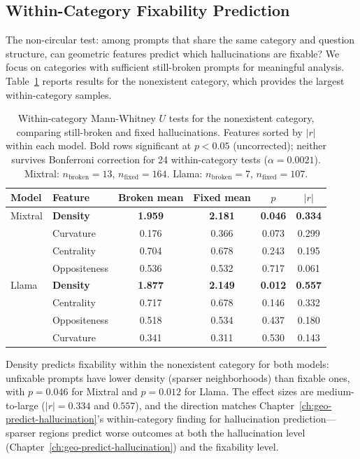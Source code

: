 \subsection{Within-Category Fixability Prediction}
\label{sec:within-cat-fixability}

The non-circular test: among prompts that share the same category and question structure, can geometric features predict which hallucinations are fixable? We focus on categories with sufficient still-broken prompts for meaningful analysis. Table~\ref{tab:within-cat-fixability} reports results for the nonexistent category, which provides the largest within-category samples.

\begin{table}[ht]
\centering
\small
\begin{tabular}{@{}llcccc@{}}
\toprule
\textbf{Model} & \textbf{Feature} & \textbf{Broken mean} & \textbf{Fixed mean} & $p$ & $|r|$ \\
\midrule
Mixtral & \textbf{Density} & \textbf{1.959} & \textbf{2.181} & \textbf{0.046} & \textbf{0.334} \\
        & Curvature & 0.176 & 0.366 & 0.073 & 0.299 \\
        & Centrality & 0.704 & 0.678 & 0.243 & 0.195 \\
        & Oppositeness & 0.536 & 0.532 & 0.717 & 0.061 \\
\addlinespace
Llama   & \textbf{Density} & \textbf{1.877} & \textbf{2.149} & \textbf{0.012} & \textbf{0.557} \\
        & Centrality & 0.717 & 0.678 & 0.146 & 0.332 \\
        & Oppositeness & 0.518 & 0.534 & 0.437 & 0.180 \\
        & Curvature & 0.341 & 0.311 & 0.530 & 0.143 \\
\bottomrule
\end{tabular}
\caption{Within-category Mann-Whitney $U$ tests for the nonexistent category, comparing still-broken and fixed hallucinations. Features sorted by $|r|$ within each model. Bold rows significant at $p < 0.05$ (uncorrected); neither survives Bonferroni correction for 24 within-category tests ($\alpha = 0.0021$). Mixtral: $n_{\text{broken}} = 13$, $n_{\text{fixed}} = 164$. Llama: $n_{\text{broken}} = 7$, $n_{\text{fixed}} = 107$.}
\label{tab:within-cat-fixability}
\end{table}

Density predicts fixability within the nonexistent category for both models: unfixable prompts have lower density (sparser neighborhoods) than fixable ones, with $p = 0.046$ for Mixtral and $p = 0.012$ for Llama. The effect sizes are medium-to-large ($|r| = 0.334$ and $0.557$), and the direction matches Chapter~\ref{ch:geo-predict-hallucination}'s within-category finding for hallucination prediction---sparser regions predict worse outcomes at both the hallucination level (Chapter~\ref{ch:geo-predict-hallucination}) and the fixability level.

